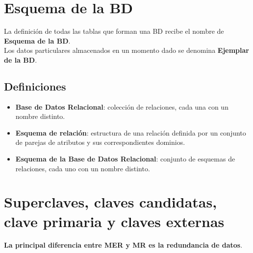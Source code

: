\documentclass{article}
\begin{document}
\newpage

\section{Esquema de la BD}
La definición de todas las tablas que forman una BD recibe el nombre de \textbf{Esquema de la BD}. \\
Los datos particulares almacenados en un momento dado se denomina \textbf{Ejemplar de la BD}. 

\subsection{Definiciones}
\begin{itemize}
    \item \textbf{Base de Datos Relacional}: colección de relaciones, cada una con un nombre distinto.

    \item \textbf{Esquema de relación}: estructura de una relación definida por un conjunto de parejas de atributos y sus correspondientes dominios.

    \item \textbf{Esquema de la Base de Datos Relacional}: conjunto de esquemas de relaciones, cada uno con un nombre distinto.
\end{itemize}

\section{Superclaves, claves candidatas, clave primaria y claves externas}
\textbf{La principal diferencia entre MER y MR es la redundancia de datos}.
\end{document}
